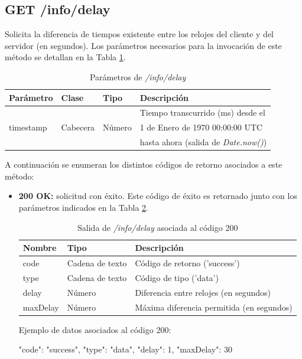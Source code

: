 %
%
\subsection{GET /info/delay}
Solicita la diferencia de tiempos existente entre los relojes del cliente y del servidor (en segundos). Los parámetros necesarios para la invocación de este método se detallan en la Tabla \ref{extra:api:infodelay:invocacion}.

\begin{table}[H]
\centering
\begin{tabular}{|l|l|l|l|}
\hline
\rowcolor[HTML]{F5F5F5}
\textbf{Parámetro}  & \textbf{Clase} & \textbf{Tipo}   & \textbf{Descripción}                         \\ \hline
                    &                &                 & Tiempo transcurrido (ms) desde el            \\
timestamp           & Cabecera       & Número          & 1 de Enero de 1970 00:00:00 UTC              \\
                    &                &                 & hasta ahora (salida de \textit{Date.now()})  \\ \hline
\end{tabular}
\caption{Parámetros de \textit{/info/delay}}
\label{extra:api:infodelay:invocacion}
\end{table}

A continuación se enumeran los distintos códigos de retorno asociados a este método:
\begin{itemize}

\item{\textbf{200 OK:} solicitud con éxito. Este código de éxito es retornado junto con los parámetros indicados en la Tabla \ref{extra:api:infodelay:ok}.
\begin{table}[H]
\centering
\begin{tabular}{|l|l|l|}
\hline
\rowcolor[HTML]{F5F5F5}
\textbf{Nombre}  & \textbf{Tipo}   & \textbf{Descripción}                      \\ \hline
code             & Cadena de texto & Código de retorno ('success')             \\ \hline
type             & Cadena de texto & Código de tipo ('data')                   \\ \hline
delay            & Número          & Diferencia entre relojes (en segundos)    \\ \hline
maxDelay         & Número          & Máxima diferencia permitida (en segundos) \\ \hline
\end{tabular}
\caption{Salida de \textit{/info/delay} asociada al código 200}
\label{extra:api:infodelay:ok}
\end{table}
\begin{minipage}{\textwidth}
Ejemplo de datos asociados al código 200:

\begin{code}[language=json]
 {
   "code": "success",
   "type": "data",
   "delay": 1,
   "maxDelay": 30
 }
\end{code}
\end{minipage}
}

\end{itemize}

